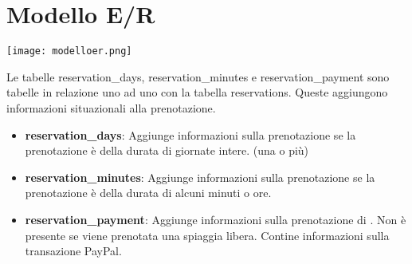 \section{Modello E/R}%
\label{sec:modello_e_r}

\texttt{[image: modelloer.png]}

Le tabelle reservation\_days, reservation\_minutes e reservation\_payment sono tabelle in relazione uno ad uno con la tabella reservations. Queste aggiungono informazioni situazionali alla prenotazione.

\begin{itemize}
    \item \textbf{reservation\_days}: Aggiunge informazioni sulla prenotazione se la prenotazione \`e della durata di giornate intere. (una o pi\`u)
    \item \textbf{reservation\_minutes}: Aggiunge informazioni sulla prenotazione se la prenotazione \`e della durata di alcuni minuti o ore.
    \item \textbf{reservation\_payment}: Aggiunge informazioni sulla prenotazione di . Non \`e presente se viene prenotata una spiaggia libera. Contine informazioni sulla transazione PayPal.
\end{itemize}